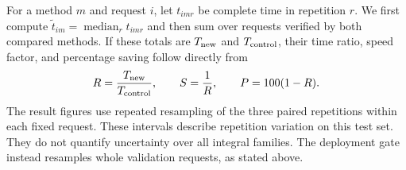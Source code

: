 For a method $m$ and request $i$, let $t_{imr}$ be complete time in repetition $r$. We first compute $\widetilde t_{im}=\operatorname{median}_r t_{imr}$ and then sum over requests verified by both compared methods. If these totals are $T_{\rm new}$ and $T_{\rm control}$, their time ratio, speed factor, and percentage saving follow directly from
\[
 R=\frac{T_{\rm new}}{T_{\rm control}},\qquad
 S=\frac{1}{R},\qquad
 P=100(1-R).
\]
The result figures use repeated resampling of the three paired repetitions within each fixed request. These intervals describe repetition variation on this test set. They do not quantify uncertainty over all integral families. The deployment gate instead resamples whole validation requests, as stated above.
